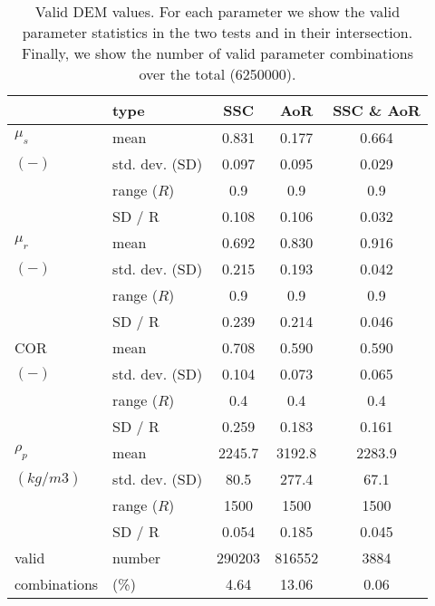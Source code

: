 \begin{table}%
\centering
\begin{tabular}{llccc}
\hline

          & type  & SSC & AoR   & SSC \& AoR \\
          \hline

    $\mu_s$ & mean  & 0.831 & 0.177 & 0.664 \\
    $(-)$   & std. dev. (SD) & 0.097 & 0.095 & 0.029 \\
          & range ($R$) & 0.9   & 0.9   & 0.9 \\
          & SD / R & 0.108 & 0.106 & 0.032 \\
          \hline
    $\mu_r$ & mean  & 0.692 & 0.830 & 0.916 \\
    $(-)$   & std. dev. (SD) & 0.215 & 0.193 & 0.042 \\
          & range ($R$) & 0.9   & 0.9   & 0.9 \\
          & SD / R & 0.239 & 0.214 & 0.046 \\
          \hline
              COR   & mean  & 0.708 & 0.590 & 0.590 \\
    $(-)$   & std. dev. (SD) & 0.104 & 0.073 & 0.065 \\
          & range ($R$) & 0.4   & 0.4   & 0.4 \\
          & SD / R & 0.259 & 0.183 & 0.161 \\
          \hline
    $\rho_p$ & mean  & 2245.7 & 3192.8 & 2283.9 \\
    $(kg/m3)$ & std. dev. (SD) & 80.5  & 277.4 & 67.1 \\
          & range ($R$) & 1500  & 1500  & 1500 \\
          & SD / R & 0.054 & 0.185 & 0.045 \\
          \hline
    valid & number & 290203 & 816552 & 3884 \\
    combinations & (\%) & 4.64  & 13.06 & 0.06 \\  

\hline
\end{tabular}
\caption[Valid DEM values]{Valid DEM values. For each parameter we show the
valid parameter statistics in the two tests and in their intersection.
Finally, we show the number of valid parameter combinations over the total
(6250000).}
\label{tab:13DEMvalidvalues}
\end{table}